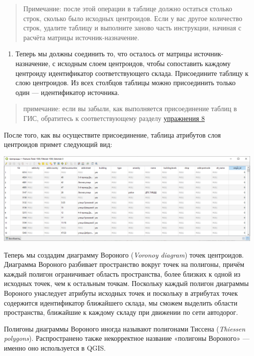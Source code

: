 \documentclass[
  12pt,
]{book}
\providecommand{\tightlist}{%
  \setlength{\itemsep}{0pt}\setlength{\parskip}{0pt}}
\begin{document}
\begin{quote}
Примечание: после этой операции в таблице должно остаться столько строк, сколько было исходных центроидов. Если у вас другое количество строк, удалите таблицу и выполните заново часть инструкции, начиная с расчёта матрицы источник-назначение.
\end{quote}

\begin{enumerate}
\def\labelenumi{\arabic{enumi}.}
\setcounter{enumi}{9}
\tightlist
\item
  Теперь мы должны соединить то, что осталось от матрицы источник-назначение, с исходным слоем центроидов, чтобы сопоставить каждому центроиду идентификатор соответствующего склада. Присоедините таблицу к слою центроидов. Из всех столбцов таблицы можно присоединить только один --- идентификатор источника.
\end{enumerate}

\begin{quote}
примечание: если вы забыли, как выполняется присоединение таблиц в ГИС, обратитесь к соответствующему разделу \protect\hyperlink{overlay-join}{упражнения 8}
\end{quote}

После того, как вы осуществите присоединение, таблица атрибутов слоя центроидов примет следующий вид:

\includegraphics{images/Ex11_RoadNetwork/centroids_attrTable.png}

Теперь мы создадим диаграмму Вороного (\emph{Voronoy diagram}) точек центроидов. Диаграмма Вороного разбивает пространство вокруг точек на полигоны, причём каждый полигон ограничивает область пространства, более близких к одной из исходных точек, чем к остальным точкам. Поскольку каждый полигон диаграммы Вороного унаследует атрибуты исходных точек и поскольку в атрибутах точек содержится идентификатор ближайшего склада, мы сможем выделить области пространства, ближайшие к каждому складу при движении по сети автодорог.

Полигоны диаграммы Вороного иногда называют полигонами Тиссена (\emph{Thiessen polygons}). Распространено также некорректное название «полигоны Вороного» --- именно оно используется в QGIS.
\end{document}
